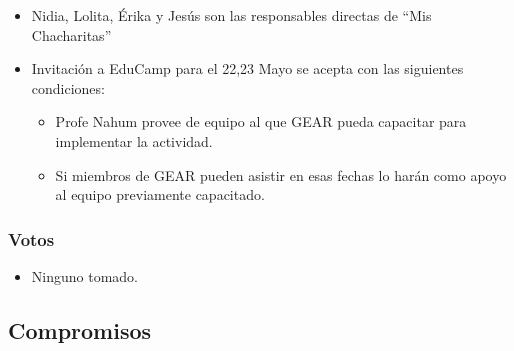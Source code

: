 \documentclass[]{book}
\providecommand{\tightlist}{%
  \setlength{\itemsep}{0pt}\setlength{\parskip}{0pt}}
\begin{document}
\begin{itemize}
\tightlist
\item
  Nidia, Lolita, Érika y Jesús son las responsables directas de ``Mis
  Chacharitas''
\item
  Invitación a EduCamp para el 22,23 Mayo se acepta con las siguientes
  condiciones:

  \begin{itemize}
  \tightlist
  \item
    Profe Nahum provee de equipo al que GEAR pueda capacitar para
    implementar la actividad.
  \item
    Si miembros de GEAR pueden asistir en esas fechas lo harán como
    apoyo al equipo previamente capacitado.
  \end{itemize}
\end{itemize}

\subsubsection{Votos}\label{votos-1}

\begin{itemize}
\tightlist
\item
  Ninguno tomado.
\end{itemize}

\subsection{Compromisos}\label{compromisos-1}
\end{document}

